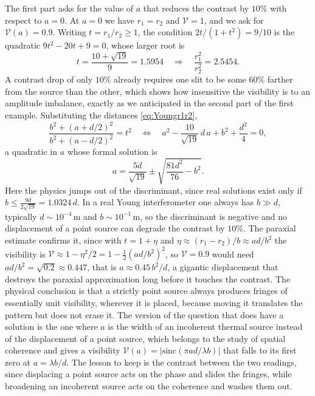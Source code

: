         The first part asks for the value of $a$ that reduces the contrast by $10\%$ with respect to $a=0$. At $a=0$ we have $r_1 = r_2$ and $\mathcal{V} = 1$, and we ask for $\mathcal{V}(a) = 0.9$. Writing $t = r_1/r_2 \geq 1$, the condition $2t/(1+t^2) = 9/10$ is the quadratic $9t^2 - 20t + 9 = 0$, whose larger root is
        \begin{equation}
            t = \frac{10+\sqrt{19}}{9} = 1.5954 \quad\Longrightarrow\quad \frac{r_1^2}{r_2^2} = 2.5454.
        \end{equation}
        A contrast drop of only $10\%$ already requires one slit to be some $60\%$ farther from the source than the other, which shows how insensitive the visibility is to an amplitude imbalance, exactly as we anticipated in the second part of the first example. Substituting the distances \ref{eq:Youngr1r2},
        \begin{equation}
            \frac{b^2 + (a+d/2)^2}{b^2 + (a-d/2)^2} = t^2 \quad\Longleftrightarrow\quad a^2 - \frac{10}{\sqrt{19}}\,d\,a + b^2 + \frac{d^2}{4} = 0,
        \end{equation}
        a quadratic in $a$ whose formal solution is
        \begin{equation}\label{eq:YoungA}
            a = \frac{5d}{\sqrt{19}} \pm \sqrt{\frac{81 d^2}{76} - b^2}.
        \end{equation}
        Here the physics jumps out of the discriminant, since real solutions exist only if $b \leq \frac{9d}{2\sqrt{19}} = 1.0324\,d$. In a real Young interferometer one always has $b\gg d$, typically $d\sim 10^{-4}\,\text{m}$ and $b\sim 10^{-1}\,\text{m}$, so the discriminant is negative and no displacement of a point source can degrade the contrast by $10\%$. The paraxial estimate confirms it, since with $t = 1+\eta$ and $\eta \approx (r_1-r_2)/b \approx ad/b^2$ the visibility is $\mathcal{V} \approx 1 - \eta^2/2 = 1 - \frac{1}{2}(ad/b^2)^2$, so $\mathcal{V} = 0.9$ would need $ad/b^2 = \sqrt{0.2} \approx 0.447$, that is $a \approx 0.45\,b^2/d$, a gigantic displacement that destroys the paraxial approximation long before it touches the contrast. The physical conclusion is that a strictly point source always produces fringes of essentially unit visibility, wherever it is placed, because moving it translates the pattern but does not erase it. The version of the question that does have a solution is the one where $a$ is the width of an incoherent thermal source instead of the displacement of a point source, which belongs to the study of spatial coherence and gives a visibility $\mathcal{V}(a) = |\text{sinc}(\pi a d/\lambda b)|$ that falls to its first zero at $a = \lambda b/d$. The lesson to keep is the contrast between the two readings, since displacing a point source acts on the phase and slides the fringes, while broadening an incoherent source acts on the coherence and washes them out.

